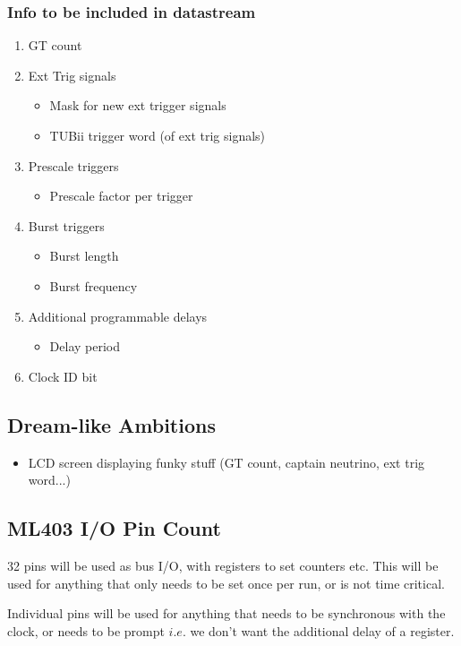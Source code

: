 \documentclass[letter, 11pt]{article}
\begin{document}
\subsubsection{Info to be included in datastream}

\begin{enumerate}
\item GT count
\item Ext Trig signals
\begin{itemize}
\item Mask for new ext trigger signals
\item TUBii trigger word (of ext trig signals)
\end{itemize}
\item Prescale triggers
\begin{itemize}
\item Prescale factor per trigger
\end{itemize}
\item Burst triggers
\begin{itemize}
\item Burst length
\item Burst frequency
\end{itemize}
\item Additional programmable delays
\begin{itemize}
\item Delay period
\end{itemize}

\item Clock ID bit
\end{enumerate}

\subsection{Dream-like Ambitions}
\begin{itemize}
\item LCD screen displaying funky stuff (GT count, captain neutrino, ext trig word...)
\end{itemize}

\subsection{ML403 I/O Pin Count}

32 pins will be used as bus I/O, with registers to set counters etc.  This will be used for anything that only needs to be set once per run, or is not time critical.

Individual pins will be used for anything that needs to be synchronous with the clock, or needs to be prompt $i.e.$ we don't want the additional delay of a register.
\end{document}
